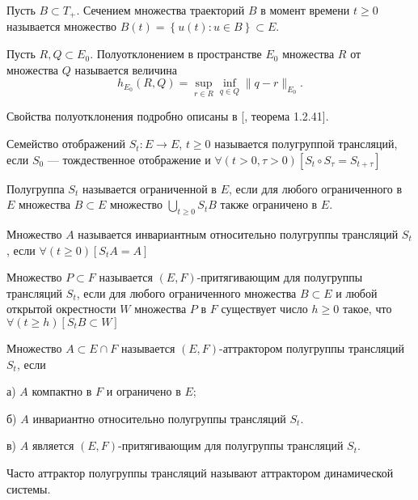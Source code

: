 \begin{definition}
Пусть $B \subset T_+$.
Сечением множества траекторий $B$ в момент времени $t \geq 0$ называется множество
$
	B(t)=\left\{u(t) : u \in B \right\} \subset E.
$
\end{definition}


\begin{definition}
Пусть $R,Q \subset E_0$.
Полуотклонением в пространстве $E_0$ множества $R$ от множества $Q$ называется величина
$$
	h_{E_0}(R,Q) = \sup_{r\in R} \inf_{q \in Q} \| q - r \|_{E_0}.
$$
\end{definition}
Свойства полуотклонения подробно описаны в [\cite{mnogozn}, теорема 1.2.41].



\begin{definition}
Семейство отображений $S_t : E \to E$, $t \geq 0$ называется полугруппой трансляций,
если $S_0$ --- тождественное отображение и
$
	\forall(t>0,\tau>0)[S_t \circ S_\tau = S_{t+\tau}]
$
\end{definition}

\begin{definition}
Полугруппа $S_t$ называется ограниченной в $E$, если для любого ограниченного в $E$ множества $B \subset E$ множество $\bigcup\limits_{t\geq0}S_t B$ также ограничено в $E$.
\end{definition}

\begin{definition}
Множество $A$ называется инвариантным относительно полугруппы трансляций $S_t$, если
$
	\forall(t\geq 0)[S_t A = A]
$
\end{definition}

\begin{definition}
Множество $P \subset F$ называется $(E,F)$-притягивающим для полугруппы трансляций $S_t$,
если для любого ограниченного множества $B \subset E$ и любой открытой окрестности $W$ множества $P$ в $F$ существует число $h\geq 0$ такое, что
$
	\forall(t \geq h)[S_t B \subset W]
$
\end{definition}


\begin{definition}
Множество $A\subset E\cap F$ называется $(E,F)$-аттрактором полугруппы трансляций $S_t$, если

а) $A$ компактно в $F$ и ограничено в $E$;

б) $A$ инвариантно относительно полугруппы трансляций $S_t$.

в) $A$ является $(E,F)$-притягивающим для полугруппы трансляций $S_t$.

Часто аттрактор полугруппы трансляций называют аттрактором динамической системы.
\end{definition}


